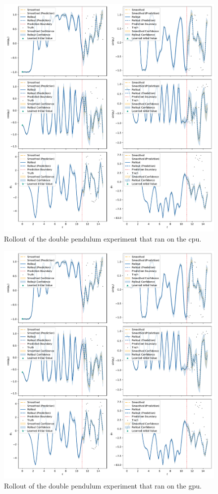 	\begin{figure}
		\centering
		\includegraphics[width=\linewidth]{figures/results/cpu-vs-gpu/acrobot-gpu/rollout-observations-N0.pdf}
		\caption{Rollout of the double pendulum experiment that ran on the \ac{cpu}.}
		\label{fig:cpuVsGpuCpu}
	\end{figure}
	\begin{figure}
		\centering
		\includegraphics[width=\linewidth]{figures/results/cpu-vs-gpu/acrobot-gpu/rollout-observations-N0.pdf}
		\caption{Rollout of the double pendulum experiment that ran on the \ac{gpu}.}
		\label{fig:cpuVsGpuGpu}
	\end{figure}

